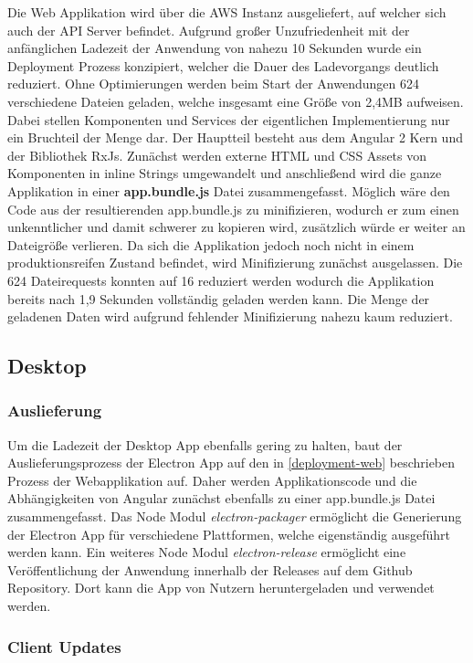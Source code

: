 Die Web Applikation wird über die \ac{AWS} Instanz ausgeliefert, auf welcher sich auch der \ac{API} Server befindet.
Aufgrund großer Unzufriedenheit mit der anfänglichen Ladezeit der Anwendung von nahezu 10 Sekunden wurde ein Deployment
Prozess konzipiert, welcher die Dauer des Ladevorgangs deutlich reduziert.
Ohne Optimierungen werden beim Start der Anwendungen 624 verschiedene Dateien geladen,
welche insgesamt eine Größe von 2,4MB aufweisen.
Dabei stellen Komponenten und Services der eigentlichen Implementierung nur ein Bruchteil der Menge dar.
Der Hauptteil besteht aus dem Angular 2 Kern und der Bibliothek RxJs.
Zunächst werden externe \ac{HTML} und \ac{CSS} Assets von Komponenten in
inline Strings umgewandelt und anschließend wird die ganze Applikation in einer \textbf{app.bundle.js} Datei zusammengefasst.
Möglich wäre den Code aus der resultierenden app.bundle.js zu minifizieren,
wodurch er zum einen unkenntlicher und damit schwerer zu kopieren wird,
zusätzlich würde er weiter an Dateigröße verlieren. Da sich die Applikation \projectname{}
jedoch noch nicht in einem produktionsreifen Zustand befindet, wird Minifizierung zunächst ausgelassen.
Die 624 Dateirequests konnten auf 16 reduziert werden wodurch die Applikation bereits nach 1,9
Sekunden vollständig geladen werden kann.
Die Menge der geladenen Daten wird aufgrund fehlender Minifizierung nahezu kaum reduziert.

\subsection{Desktop}

\subsubsection{Auslieferung}
Um die Ladezeit der Desktop App ebenfalls gering zu halten, baut der Auslieferungsprozess der Electron App
auf den in \ref{deployment-web} beschrieben Prozess der Webapplikation auf. Daher werden Applikationscode und die
Abhängigkeiten von Angular zunächst ebenfalls zu einer app.bundle.js Datei zusammengefasst.
Das Node Modul \emph{electron-packager} ermöglicht die Generierung der Electron App für verschiedene Plattformen,
welche eigenständig ausgeführt werden kann.
Ein weiteres Node Modul \emph{electron-release} ermöglicht eine Veröffentlichung
der Anwendung innerhalb der Releases auf dem Github Repository.
Dort kann die App von Nutzern heruntergeladen und verwendet werden.

\subsubsection{Client Updates}

